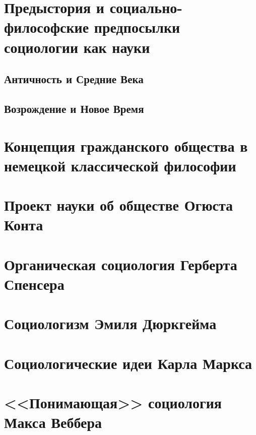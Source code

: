   \section{Предыстория и социально-философские предпосылки социологии как науки}
    \subsection{Античность и Средние Века}



    \subsection{Возрождение и Новое Время}

  \section{Концепция гражданского общества в немецкой классической философии}

  \section{Проект науки об обществе Огюста Конта}

  \section{Органическая социология Герберта Спенсера}

  \section{Социологизм Эмиля Дюркгейма}

  \section{Социологические идеи Карла Маркса}

  \section{<<Понимающая>> социология Макса Веббера}
